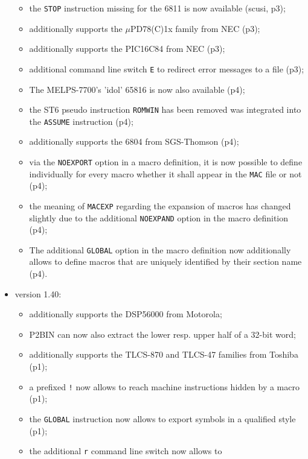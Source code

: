 \documentclass[12pt,twoside]{report}
\newcommand{\tty}[1]{{\tt #1}}
\begin{document}
\begin{itemize}
{\begin{itemize}
{            instead of standard output (p3);}
      \item{the \tty{STOP} instruction missing for the 6811 is now
            available (scusi, p3);}
      \item{additionally supports the $\mu$PD78(C)1x family from
            NEC (p3);}
      \item{additionally supports the PIC16C84 from NEC (p3);}
      \item{additional command line switch \tty{E} to redirect error
            messages to a file (p3);}
      \item{The MELPS-7700's 'idol' 65816 is now also available
            (p4);}
      \item{the ST6 pseudo instruction \tty{ROMWIN} has been removed
            was integrated into the \tty{ASSUME} instruction (p4);}
      \item{additionally supports the 6804 from SGS-Thomson (p4);}
      \item{via the \tty{NOEXPORT} option in a macro definition, it is
            now possible to define individually for every macro
            whether it shall appear in the \tty{MAC} file or not (p4);}
      \item{the meaning of \tty{MACEXP} regarding the expansion of
            macros has changed slightly due to the additional
            \tty{NOEXPAND} option in the macro definition (p4);}
      \item{The additional \tty{GLOBAL} option in the macro definition
            now additionally allows to define macros that are
            uniquely identified by their section name (p4).}
      \end{itemize}}
\item{version 1.40:
      \begin{itemize}
      \item{additionally supports the DSP56000 from Motorola;}
      \item{P2BIN can now also extract the lower resp. upper
            half of a 32-bit word;}
      \item{additionally supports the TLCS-870 and TLCS-47
            families from Toshiba (p1);}
      \item{a prefixed \tty{!} now allows to reach machine instructions
            hidden by a macro (p1);}
      \item{the \tty{GLOBAL} instruction now allows to export symbols
            in a qualified style (p1);}
      \item{the additional \tty{r} command line switch now allows to
}
\end{itemize}}
\end{itemize}
\end{document}
